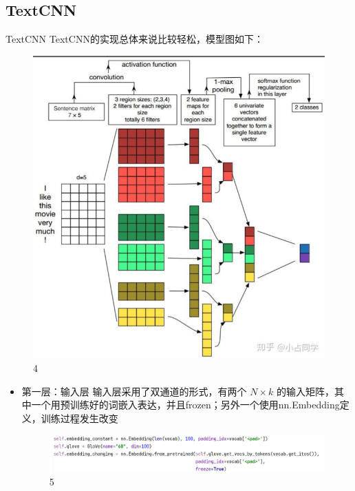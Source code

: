 \documentclass[UTF8]{ctexbeamer}
\begin{document}
\subsection{TextCNN}
\begin{frame}[allowframebreaks]{TextCNN}
TextCNN的实现总体来说比较轻松，模型图如下：
\begin{figure}[H] %
	\centering %
	\includegraphics[scale=0.2]{textcnn_model.jpg} %
	\caption{4}
\end{figure}
\begin{itemize}
	\item 第一层：输入层
	输入层采用了双通道的形式，有两个 $N\times k$ 的输入矩阵，其中一个用预训练好的词嵌入表达，并且frozen；另外一个使用nn.Embedding定义，训练过程发生改变
	\begin{figure}[H] %
		\centering %
		\includegraphics[scale=0.4]{textcnn1.png} %
		\caption{5}
	\end{figure}\newpage

\end{itemize}
\end{frame}
\end{document}
